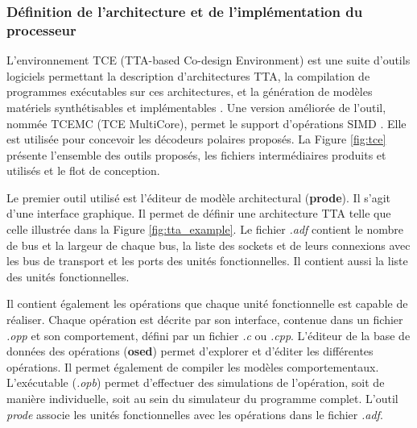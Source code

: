 \subsubsection{Définition de l'architecture et de l'implémentation du processeur}

L'environnement TCE (TTA-based Co-design Environment) est une suite d'outils logiciels permettant la description d'architectures TTA, la compilation de programmes exécutables sur ces architectures, et la génération de modèles matériels synthétisables et implémentables \cite{jaaskelainen_hw/sw_2017}. Une version améliorée de l'outil, nommée TCEMC (TCE MultiCore), permet le support d'opérations SIMD \cite{tcemc_2011}. Elle est utilisée pour concevoir les décodeurs polaires proposés. La Figure \ref{fig:tce} présente l'ensemble des outils proposés, les fichiers intermédiaires produits et utilisés et le flot de conception.

Le premier outil utilisé est l'éditeur de modèle architectural (\textbf{prode}). Il s'agit d'une interface graphique. Il permet de définir une architecture TTA telle que celle illustrée dans la Figure \ref{fig:tta_example}. Le fichier \textit{.adf} contient le nombre de bus et la largeur de chaque bus, la liste des sockets et de leurs connexions avec les bus de transport et les ports des unités fonctionnelles. Il contient aussi la liste des unités fonctionnelles.

Il contient également les opérations que chaque unité fonctionnelle est capable de réaliser. Chaque opération est décrite par son interface, contenue dans un fichier \textit{.opp} et son comportement, défini par un fichier \textit{.c} ou \textit{.cpp}. L'éditeur de la base de données des opérations (\textbf{osed}) permet d'explorer et d'éditer les différentes opérations. Il permet également de compiler les modèles comportementaux. L'exécutable (\textit{.opb}) permet d'effectuer des simulations de l'opération, soit de manière individuelle, soit au sein du simulateur du programme complet. L'outil \textit{prode} associe les unités fonctionnelles avec les opérations dans le fichier \textit{.adf}.

